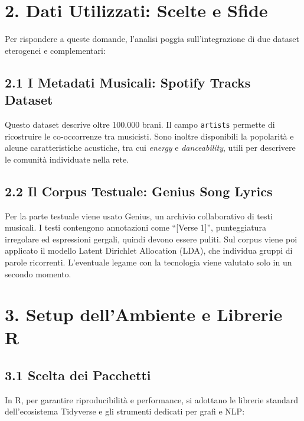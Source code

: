 \documentclass[
]{article}
\begin{document}
\section{2. Dati Utilizzati: Scelte e
Sfide}\label{dati-utilizzati-scelte-e-sfide}

Per rispondere a queste domande, l'analisi poggia sull'integrazione di
due dataset eterogenei e complementari:

\subsection{2.1 I Metadati Musicali: Spotify Tracks
Dataset}\label{i-metadati-musicali-spotify-tracks-dataset}

Questo dataset descrive oltre 100.000 brani. Il campo \texttt{artists}
permette di ricostruire le co-occorrenze tra musicisti. Sono inoltre
disponibili la popolarità e alcune caratteristiche acustiche, tra cui
\emph{energy} e \emph{danceability}, utili per descrivere le comunità
individuate nella rete.

\subsection{2.2 Il Corpus Testuale: Genius Song
Lyrics}\label{il-corpus-testuale-genius-song-lyrics}

Per la parte testuale viene usato Genius, un archivio collaborativo di
testi musicali. I testi contengono annotazioni come ``{[}Verse 1{]}'',
punteggiatura irregolare ed espressioni gergali, quindi devono essere
puliti. Sul corpus viene poi applicato il modello Latent Dirichlet
Allocation (LDA), che individua gruppi di parole ricorrenti. L'eventuale
legame con la tecnologia viene valutato solo in un secondo momento.

\section{3. Setup dell'Ambiente e Librerie
R}\label{setup-dellambiente-e-librerie-r}

\subsection{3.1 Scelta dei Pacchetti}\label{scelta-dei-pacchetti}

In R, per garantire riproducibilità e performance, si adottano le
librerie standard dell'ecosistema Tidyverse e gli strumenti dedicati per
grafi e NLP:
\end{document}
